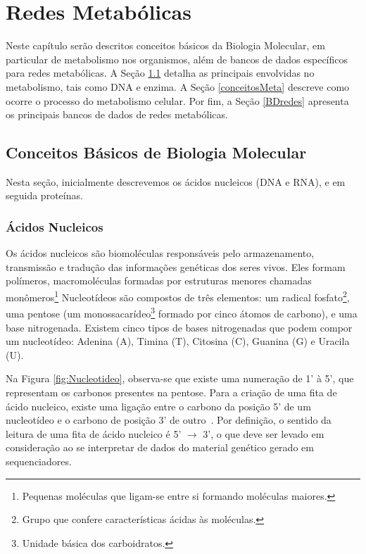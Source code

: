 \chapter{Redes Metabólicas}
 
\indent Neste capítulo serão descritos conceitos básicos da Biologia Molecular, em particular de metabolismo nos organismos, além de bancos de dados específicos para redes metabólicas. A Seção \ref{conceitosBM} detalha as principais envolvidas no metabolismo, tais como DNA e enzima. A Seção \ref{conceitosMeta} descreve como ocorre o processo do metabolismo celular. Por fim, a Seção \ref{BDredes} apresenta os principais bancos de dados de redes metabólicas.



\section{Conceitos Básicos de Biologia Molecular} \label{conceitosBM}

\indent Nesta seção, inicialmente descrevemos os ácidos nucleicos (DNA e RNA), e em seguida proteínas.

\subsection{Ácidos Nucleicos} \label{aceidosNucleicos}

\indent Os ácidos nucleicos são biomoléculas responsáveis pelo armazenamento, transmissão e tradução das informações genéticas dos seres vivos. Eles formam polímeros, macromoléculas formadas por estruturas menores chamadas monômeros\footnote{Pequenas moléculas que ligam-se entre si formando moléculas maiores.} Nucleotídeos são compostos de três elementos: um radical fosfato\footnote{Grupo que confere características ácidas às moléculas.}, uma pentose (um monossacarídeo\footnote{Unidade básica dos carboidratos.} formado por cinco átomos de carbono), e uma base nitrogenada. Existem cinco tipos de bases nitrogenadas que podem compor um nucleotídeo: Adenina (A), Timina (T), Citosina (C), Guanina (G) e Uracila (U).

\indent Na Figura \ref{fig:Nucleotideo}, observa-se que existe uma numeração de 1' à 5', que representam os carbonos presentes na pentose. Para a criação de uma fita de ácido nucleico, existe uma ligação entre o carbono da posição 5' de um nucleotídeo e o carbono de posição 3' de outro~\cite{setubal97}. Por definição, o sentido da leitura de uma fita de ácido nucleico é 5' $\rightarrow$ 3', o que deve ser levado em consideração ao se interpretar de dados do material genético gerado em sequenciadores.

